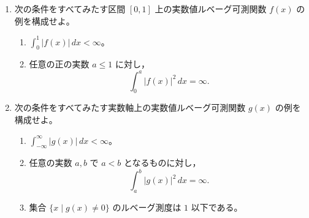 \documentclass[12pt]{jlreq}
\newcommand{\dd}{\,d}
\begin{document}
\begin{enumerate}
  \item 次の条件をすべてみたす区間 \([0,1]\) 上の実数値ルベーグ可測関数 \(f(x)\) の例を構成せよ。
  \begin{enumerate}
    \item \(\displaystyle\int_0^1 |f(x)|\dd x<\infty\)。
    \item 任意の正の実数 \(a\le1\) に対し，
    \[
      \int_0^a |f(x)|^2\dd x=\infty.
    \]
  \end{enumerate}
  \item 次の条件をすべてみたす実数軸上の実数値ルベーグ可測関数 \(g(x)\) の例を構成せよ。
  \begin{enumerate}
    \item \(\displaystyle\int_{-\infty}^{\infty}|g(x)|\dd x<\infty\)。
    \item 任意の実数 \(a,b\) で \(a<b\) となるものに対し，
    \[
      \int_a^b |g(x)|^2\dd x=\infty.
    \]
    \item 集合 \(\{x\mid g(x)\ne0\}\) のルベーグ測度は \(1\) 以下である。
  \end{enumerate}
\end{enumerate}
\end{document}
